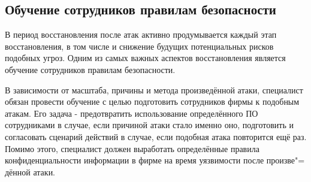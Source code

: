 \newpage
\subsection{Обучение сотрудников правилам безопасности}

    В период восстановления после атак активно продумывается каждый этап восстановления, в том числе и снижение будущих
    потенциальных рисков подобных угроз. Одним из самых важных аспектов восстановления является обучение сотрудников правилам безопасности.
    
    В зависимости от масштаба, причины и метода произведённой атаки, специалист обязан провести обучение с целью подготовить сотрудников фирмы 
    к подобным атакам. Его задача - предотвратить использование определённого ПО сотрудниками в случае, если причиной атаки стало именно оно,
    подготовить и согласовать сценарий действий в случае, если подобная атака повторится ещё раз. Помимо этого, специалист должен выработать
    определённые правила конфиденциальности информации в фирме на время уязвимости после произве"=
    дённой атаки.




